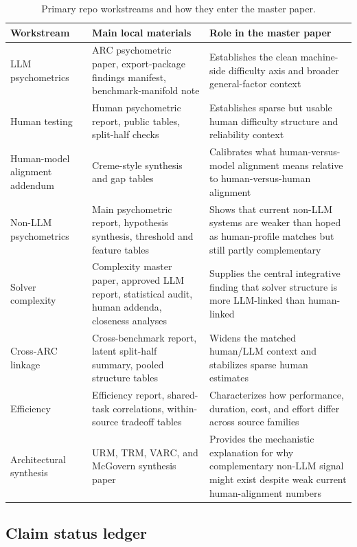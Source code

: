 \documentclass[11pt,letterpaper]{article}
\begin{document}
\begin{table}[t]
\centering
\small
\caption{Primary repo workstreams and how they enter the master paper.}
\begin{tabular}{p{1.5in}p{1.9in}p{2.4in}}
\toprule
\textbf{Workstream} & \textbf{Main local materials} & \textbf{Role in the master paper} \\
\midrule
LLM psychometrics & ARC psychometric paper, export-package findings manifest, benchmark-manifold note & Establishes the clean machine-side difficulty axis and broader general-factor context \\
Human testing & Human psychometric report, public tables, split-half checks & Establishes sparse but usable human difficulty structure and reliability context \\
Human-model alignment addendum & Creme-style synthesis and gap tables & Calibrates what human-versus-model alignment means relative to human-versus-human alignment \\
Non-LLM psychometrics & Main psychometric report, hypothesis synthesis, threshold and feature tables & Shows that current non-LLM systems are weaker than hoped as human-profile matches but still partly complementary \\
Solver complexity & Complexity master paper, approved LLM report, statistical audit, human addenda, closeness analyses & Supplies the central integrative finding that solver structure is more LLM-linked than human-linked \\
Cross-ARC linkage & Cross-benchmark report, latent split-half summary, pooled structure tables & Widens the matched human/LLM context and stabilizes sparse human estimates \\
Efficiency & Efficiency report, shared-task correlations, within-source tradeoff tables & Characterizes how performance, duration, cost, and effort differ across source families \\
Architectural synthesis & URM, TRM, VARC, and McGovern synthesis paper & Provides the mechanistic explanation for why complementary non-LLM signal might exist despite weak current human-alignment numbers \\
\bottomrule
\end{tabular}
\end{table}

\subsection{Claim status ledger}
\end{document}
